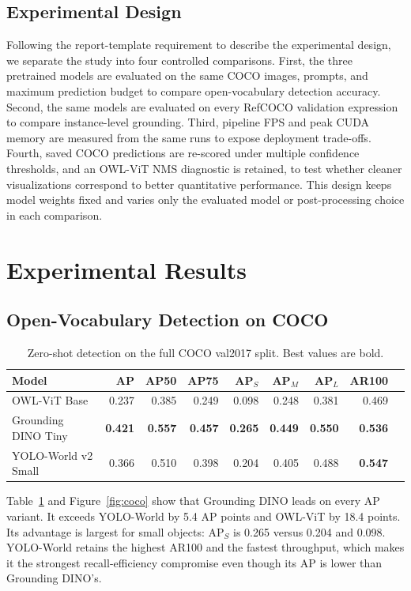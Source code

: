 \documentclass[conference]{IEEEtran}
\begin{document}
\subsection{Experimental Design}

Following the report-template requirement to describe the experimental design,
we separate the study into four controlled comparisons. First, the three
pretrained models are evaluated on the same COCO images, prompts, and maximum
prediction budget to compare open-vocabulary detection accuracy. Second, the
same models are evaluated on every RefCOCO validation expression to compare
instance-level grounding. Third, pipeline FPS and peak CUDA memory are measured
from the same runs to expose deployment trade-offs. Fourth, saved COCO
predictions are re-scored under multiple confidence thresholds, and an OWL-ViT
NMS diagnostic is retained, to test whether cleaner visualizations correspond
to better quantitative performance. This design keeps model weights fixed and
varies only the evaluated model or post-processing choice in each comparison.

\section{Experimental Results}

\subsection{Open-Vocabulary Detection on COCO}

\begin{table}[t]
\caption{Zero-shot detection on the full COCO val2017 split. Best values are
bold.}
\label{tab:coco}
\centering
\small
\begin{tabular}{lrrrrrrrr}
\toprule
Model & AP & AP50 & AP75 & AP$_S$ & AP$_M$ & AP$_L$ & AR100 \\
\midrule
OWL-ViT Base & 0.237 & 0.385 & 0.249 & 0.098 & 0.248 & 0.381 & 0.469 \\
Grounding DINO Tiny & \textbf{0.421} & \textbf{0.557} & \textbf{0.457} &
\textbf{0.265} & \textbf{0.449} & \textbf{0.550} & \textbf{0.536} \\
YOLO-World v2 Small & 0.366 & 0.510 & 0.398 & 0.204 & 0.405 & 0.488 & \textbf{0.547} \\
\bottomrule
\end{tabular}
\end{table}

Table~\ref{tab:coco} and Figure~\ref{fig:coco} show that Grounding DINO leads
on every AP variant. It exceeds YOLO-World by 5.4 AP points and OWL-ViT by
18.4 points. Its advantage is largest for small objects: AP$_S$ is 0.265
versus 0.204 and 0.098. YOLO-World retains the highest AR100 and the fastest
throughput, which makes it the strongest recall-efficiency compromise even
though its AP is lower than Grounding DINO's.
\end{document}
